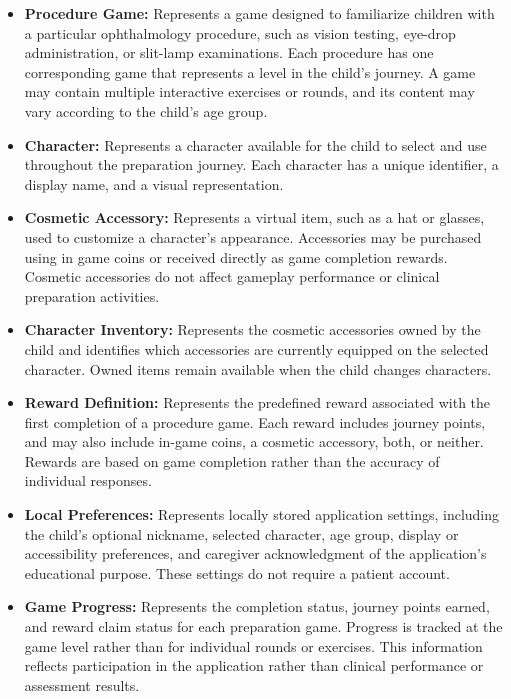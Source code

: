 \documentclass[12pt]{article}
\begin{document}
\begin{itemize}

    \item \textbf{Procedure Game:}
    Represents a game designed to familiarize children
    with a particular ophthalmology procedure, such as
    vision testing, eye-drop administration, or slit-lamp
    examinations. Each procedure has one corresponding
    game that represents a level in the child's journey.
    A game may contain multiple interactive exercises
    or rounds, and its content may vary according to
    the child's age group.

    \item \textbf{Character:}
    Represents a character available for the child to
    select and use throughout the preparation journey.
    Each character has a unique identifier, a display
    name, and a visual representation.

    \item \textbf{Cosmetic Accessory:}
    Represents a virtual item, such as a hat or glasses,
    used to customize a character's appearance.
    Accessories may be purchased using in game coins
    or received directly as game completion rewards.
    Cosmetic accessories do not affect gameplay
    performance or clinical preparation activities.

    \item \textbf{Character Inventory:}
    Represents the cosmetic accessories owned by the
    child and identifies which accessories are currently
    equipped on the selected character. Owned items
    remain available when the child changes characters.

    \item \textbf{Reward Definition:}
    Represents the predefined reward associated with
    the first completion of a procedure game.
    Each reward includes journey points, and may also
    include in-game coins, a cosmetic accessory, both,
    or neither.
    Rewards are based on game completion rather
    than the accuracy of individual responses.

    \item \textbf{Local Preferences:}
    Represents locally stored application settings,
    including the child's optional nickname, selected
    character, age group, display or accessibility
    preferences, and caregiver acknowledgment of
    the application's educational purpose.
    These settings do not require a patient account.

    \item \textbf{Game Progress:}
    Represents the completion status, journey points
    earned, and reward claim status for each preparation
    game. Progress is tracked at the game level rather
    than for individual rounds or exercises.
    This information reflects participation in the
    application rather than clinical performance
    or assessment results.


\end{itemize}
\end{document}
